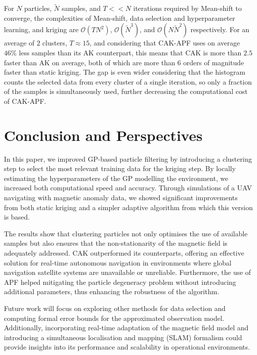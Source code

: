 \documentclass[conference]{IEEEtran}
\begin{document}
For $N$ particles, $\tilde{N}$ samples, and $T<<N$ iterations required by Mean-shift to converge, the complexities of Mean-shift, data selection and hyperparameter learning, and kriging are $\mathcal{O}(TN^2)$, $\mathcal{O}(\tilde{N}^3)$, and $\mathcal{O}(N\tilde{N}^2)$ respectively. For an average of $2$ clusters, $T\approx15$, and considering that CAK-APF uses on average $46\%$ less samples than its AK counterpart, this means that CAK is more than $2.5$ faster than AK on average, both of which are more than $6$ orders of magnitude faster than static kriging. The gap is even wider considering that the histogram counts the selected data from every cluster of a single iteration, so only a fraction of the samples is simultaneously used, further decreasing the computational cost of CAK-APF.

\section{Conclusion and Perspectives}

In this paper, we improved GP-based particle filtering by introducing a clustering step to select the most relevant training data for the kriging step. By locally estimating the hyperparameters of the GP modelling the environment, we increased both computational speed and accuracy. Through simulations of a UAV navigating with magnetic anomaly data, we showed significant improvements from both static kriging and a simpler adaptive algorithm from which this version is based.

The results show that clustering particles not only optimises the use of available samples but also ensures that the non-stationarity of the magnetic field is adequately addressed. CAK outperformed its counterparts, offering an effective solution for real-time autonomous navigation in environments where global navigation satellite systems are unavailable or unreliable. Furthermore, the use of  APF helped mitigating the particle degeneracy problem without introducing additional parameters, thus enhancing the robustness of the algorithm.

Future work will focus on exploring other methods for data selection and computing formal error bounds for the approximated observation model. Additionally, incorporating real-time adaptation of the magnetic field model and introducing a simultaneous localisation and mapping (SLAM) formalism could provide insights into its performance and scalability in operational environments.

\printbibliography
\end{document}
